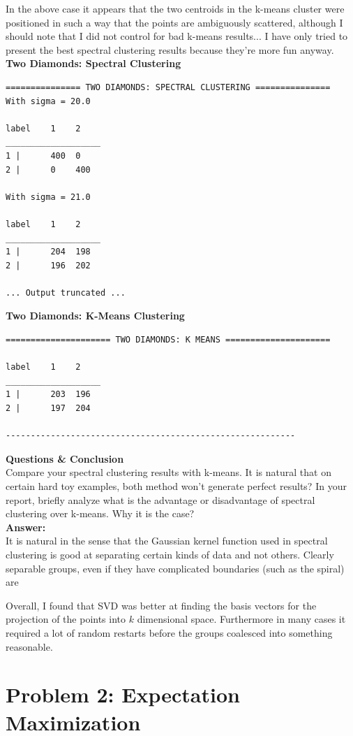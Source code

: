 \documentclass[11pt]{article}
\begin{document}
In the above case it appears that the two centroids in the k-means cluster were positioned in such a way that the points are ambiguously scattered, although I should note that I did not control for bad k-means results... I have only tried to present the best spectral clustering results because they're more fun anyway. 
\\[5pt]
\textbf{Two Diamonds: Spectral Clustering} 
\begin{verbatim}
=============== TWO DIAMONDS: SPECTRAL CLUSTERING ===============
With sigma = 20.0

label    1    2    
___________________
1 |      400  0    
2 |      0    400    

With sigma = 21.0

label    1    2    
___________________
1 |      204  198    
2 |      196  202    

... Output truncated ... 	

\end{verbatim}
\textbf{Two Diamonds: K-Means Clustering} 
\begin{verbatim}
===================== TWO DIAMONDS: K MEANS =====================

label    1    2    
___________________
1 |      203  196    
2 |      197  204    

----------------------------------------------------------
\end{verbatim}
\textbf{Questions \& Conclusion}
\\[5pt]
Compare your spectral clustering results with k-means. It is natural that on certain hard toy examples, both method won't generate perfect results? In your report, briefly analyze what is the advantage or disadvantage of spectral clustering over k-means. Why it is the case? 
\\[5pt]\textbf{Answer:}\\[5pt]
It is natural in the sense that the Gaussian kernel function used in spectral clustering is good at separating certain kinds of data and not others. Clearly separable groups, even if they have complicated boundaries (such as the spiral) are

Overall, I found that SVD was better at finding the basis vectors for the projection of the points into $k$ dimensional space. Furthermore in many cases it required a lot of random restarts before the groups coalesced into something reasonable. 
\section*{Problem 2: Expectation Maximization}
\end{document}
